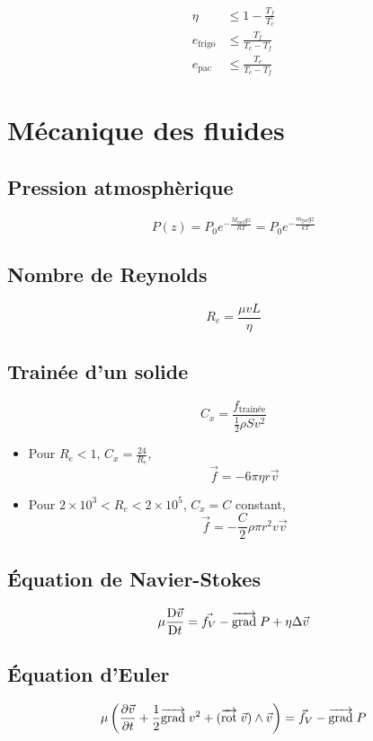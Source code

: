 \documentclass[]{article}
\begin{document}
\begin{align*}
    \eta &\leq 1 - \frac{T_f}{T_c} \\
    e_{\text{frigo}} &\leq \frac{T_f}{T_c - T_f} \\
    e_{\text{pac}} &\leq \frac{T_c}{T_c - T_f}
\end{align*}

\section{Mécanique des fluides}

\subsection*{Pression atmosphèrique}
\[ P(z) = P_0 e^{-\frac{M_{\text{mol}}gz}{RT}} = P_0 e^{-\frac{m_{\text{gaz}}gz}{kT}} \]

\subsection*{Nombre de Reynolds}

\[ R_e = \frac{\mu v L}{\eta} \]

\subsection*{Trainée d'un solide}

\[ C_x = \frac{f_{\text{trainée}}}{\frac{1}{2}\rho S v^2} \]

\begin{itemize}
    \item Pour $R_e < 1$, $C_x = \frac{24}{R_e}$, \[\vec{f} = -6\pi \eta r \vec{v}\]
    \item Pour $2\times10^3 < R_e < 2\times10^5$, $C_x = C$ constant, \[\vec{f} = - \frac{C}{2}\rho \pi r^2 v \vec{v}\]
\end{itemize}

\subsection*{Équation de Navier-Stokes}
\[ \mu \frac{\text{D} \vec{v}}{\text{D} t} = \vec{f_V} - \overrightarrow{{\text{grad}}} \; P + \eta \Delta \vec{v} \]

\subsection*{Équation d'Euler}
\[ \mu \left( \frac{\partial \vec{v}}{\partial t} + \frac{1}{2} \overrightarrow{{\text{grad}}} \; v^2 + (\overrightarrow{\text{rot}} \; \vec{v}) \wedge \vec{v} \right) = \vec{f}_V - \overrightarrow{{\text{grad}}} \; P \]
\end{document}
